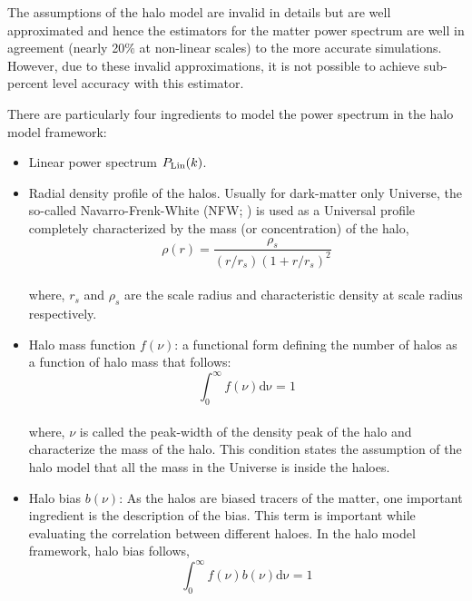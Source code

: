 The assumptions of the halo model are invalid in details but are well approximated and 
hence the estimators for the matter power spectrum are well in agreement 
(nearly 20$\%$ at non-linear scales)
to the more accurate simulations. However, due to these invalid approximations, it is not
possible to achieve sub-percent level accuracy with this estimator. 

There are particularly four ingredients to model the power spectrum in the halo model framework:

\begin{itemize}
	\item Linear power spectrum $P_{\rm Lin}(k)$.

	\item Radial density profile of the halos. 
			Usually for dark-matter only 	Universe, the so-called
			Navarro-Frenk-White (NFW; \cite{1997ApJ...490..493N}) 
			is used as a Universal profile completely characterized by the
			mass (or concentration) of the halo,
			\begin{equation}
				\rho(r) = \dfrac{\rho_s}{(r/r_s)(1+r/r_s)^2}
			\end{equation}
			\\
			where, $r_s$ and $\rho_s$ are the scale radius and characteristic density at scale radius
			respectively.

	\item Halo mass function $f(\nu)$: a functional form defining the number of halos as a function of halo
			mass that follows:
			\begin{equation}
				\int_0^{\infty} f(\nu)\mathrm{d\nu} = 1
			\end{equation}
			\\
			where, $\nu$ is called the peak-width of the density peak of the halo 
			and characterize the mass of the halo. This condition states the assumption of the
			halo model that all the mass in the Universe is inside the haloes. 

	\item Halo bias $b(\nu)$: As the halos are biased tracers of the matter, one important ingredient is 
			the description of the bias. This term is important while evaluating the correlation
			between different haloes. In the halo model framework, halo bias follows,
			\begin{equation}
				\int_0^{\infty} f(\nu) b(\nu) \mathrm{d\nu} = 1
			\end{equation}
\end{itemize}

